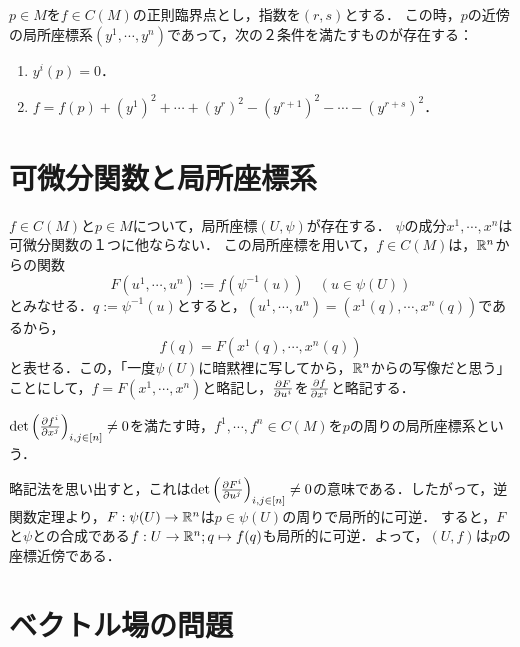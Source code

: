 \documentclass[uplatex,dvipdfmx]{jsreport}
\begin{document}
\begin{theorem}
    $p\in M$を$f\in C(M)$の正則臨界点とし，指数を$(r,s)$とする．
    この時，$p$の近傍の局所座標系$(y^1,\cdots,y^n)$であって，次の２条件を満たすものが存在する：
    \begin{enumerate}
        \item $y^i(p)=0$．
        \item $f=f(p)+(y^1)^2+\cdots+(y^r)^2-(y^{r+1})^2-\cdots-(y^{r+s})^2$．
    \end{enumerate}
\end{theorem}

\section{可微分関数と局所座標系}

\begin{notation}
    $f\in C(M)$と$p\in M$について，局所座標$(U,\psi)$が存在する．
    $\psi$の成分$x^1,\cdots,x^n$は可微分関数の１つに他ならない．
    この局所座標を用いて，$f\in C(M)$は，$\mathbb{R}^n$からの関数
    \[F(u^1,\cdots,u^n):=f(\psi^{-1}(u))\quad(u\in\psi(U))\]
    とみなせる．$q:=\psi^{-1}(u)$とすると，$(u^1,\cdots,u^n)=(x^1(q),\cdots,x^n(q))$であるから，
    \[f(q)=F(x^1(q),\cdots,x^n(q))\]
    と表せる．この，「一度$\psi(U)$に暗黙裡に写してから，$\mathbb{R}^n$からの写像だと思う」ことにして，$f=F(x^1,\cdots,x^n)$と略記し，$\frac{\partial F}{\partial u^i}$を$\frac{\partial f}{\partial x^i}$と略記する．
\end{notation}

\begin{definition}
    $\det\left(\frac{\partial f^i}{\partial x^j}\right)_{i,j\in[n]}\ne 0$を満たす時，$f^1,\cdots,f^n\in C(M)$を$p$の周りの局所座標系という．
\end{definition}
\begin{remarks}
    略記法を思い出すと，これは$\det\left(\frac{\partial F^i}{\partial u^j}\right)_{i,j\in[n]}\ne 0$の意味である．したがって，逆関数定理より，$F:\psi(U)\to\mathbb{R}^n$は$p\in\psi(U)$の周りで局所的に可逆．
    すると，$F$と$\psi$との合成である$f:U\to\mathbb{R}^n;q\mapsto f(q)$も局所的に可逆．よって，$(U,f)$は$p$の座標近傍である．
\end{remarks}

\section{ベクトル場の問題}
\end{document}
